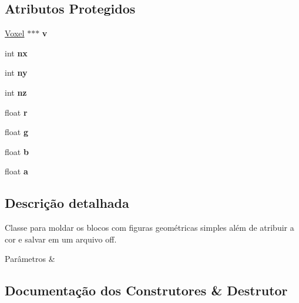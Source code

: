 \subsection*{Atributos Protegidos}
\begin{DoxyCompactItemize}
\item 
\mbox{\label{class_sculptor_a4ca53a2f2fbf41ca42dfe729ebe693f1}} 
\hyperlink{struct_voxel}{Voxel} $\ast$$\ast$$\ast$ {\bfseries v}
\item 
\mbox{\label{class_sculptor_ad1e32f9042538419a3bc7b376f7813b8}} 
int {\bfseries nx}
\item 
\mbox{\label{class_sculptor_a1ce2ff97ec94927928ab3f5ec4ba6761}} 
int {\bfseries ny}
\item 
\mbox{\label{class_sculptor_a33204e7df26a7ee4c7192381a24335d3}} 
int {\bfseries nz}
\item 
\mbox{\label{class_sculptor_a3f5d2ec3b66d645019b8d81c810a1cd8}} 
float {\bfseries r}
\item 
\mbox{\label{class_sculptor_a208c06af69a81a1568df4493868816f1}} 
float {\bfseries g}
\item 
\mbox{\label{class_sculptor_a7aafd7305ea634252d8288b60536cd96}} 
float {\bfseries b}
\item 
\mbox{\label{class_sculptor_a6fd0157dcf17582f0edd5fddf157604e}} 
float {\bfseries a}
\end{DoxyCompactItemize}


\subsection{Descrição detalhada}
Classe para moldar os blocos com figuras geométricas simples além de atribuir a cor e salvar em um arquivo off. 


\begin{DoxyParams}{Parâmetros}
{\em } & \\
\hline
\end{DoxyParams}


\subsection{Documentação dos Construtores \& Destrutor}
\mbox{\label{class_sculptor_a014e3ef5517bf0e9d9e14486b6ac6433}} 
